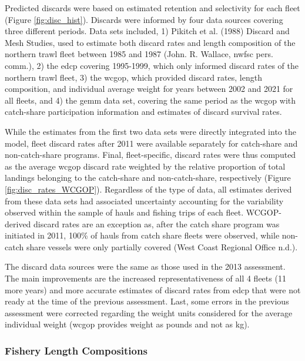 \documentclass[11pt,
  english,
  letterpaper,
]{article}
\begin{document}
Predicted discards were based on estimated retention and selectivity for each fleet (Figure \ref{fig:disc_hist}). Discards were informed by four data sources covering three different periods. Data sets included, 1) Pikitch et al. (1988) Discard and Mesh Studies, used to estimate both discard rates and length composition of the northern trawl fleet between 1985 and 1987 (John. R. Wallace, \gls{nwfsc} pers. comm.), 2) the \gls{edcp} covering 1995-1999, which only informed discard rates of the northern trawl fleet, 3) the \gls{wcgop}, which provided discard rates, length composition, and individual average weight for years between 2002 and 2021 for all fleets, and 4) the \gls{gemm} data set, covering the same period as the \gls{wcgop} with catch-share participation information and estimates of discard survival rates.

While the estimates from the first two data sets were directly integrated into the model, fleet discard rates after 2011 were available separately for catch-share and non-catch-share programs. Final, fleet-specific, discard rates were thus computed as the average \gls{wcgop} discard rate weighted by the relative proportion of total landings belonging to the catch-share and non-catch-share, respectively (Figure \ref{fig:disc_rates_WCGOP}). Regardless of the type of data, all estimates derived from these data sets had associated uncertainty accounting for the variability observed within the sample of hauls and fishing trips of each fleet. WCGOP-derived discard rates are an exception as, after the catch share program was initiated in 2011, 100\% of hauls from catch share fleets were observed, while non-catch share vessels were only partially covered (West Coast Regional Office n.d.).

The discard data sources were the same as those used in the 2013 assessment. The main improvements are the increased representativeness of all 4 fleets (11 more years) and more accurate estimates of discard rates from \gls{edcp} that were not ready at the time of the previous assessment. Last, some errors in the previous assessment were corrected regarding the weight units considered for the average individual weight (\gls{wcgop} provides weight as pounds and not as kg).

\hypertarget{fishery-length-compositions}{%
\subsubsection{Fishery Length Compositions}\label{fishery-length-compositions}}
\end{document}
